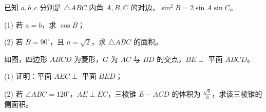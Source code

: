 \begin{question}
已知 $a,b,c$ 分别是 $\triangle ABC$ 内角 $A,B,C$ 的对边，$\sin^2B=2\sin A\sin C$。

(1) 若 $a=b$，求 $\cos B$；

(2) 若 $B=90^\circ$，且 $a=\sqrt2$，求 $\triangle ABC$ 的面积。

\Needspace{0.4\textheight}
\end{question}
\begin{question}
如图，四边形 $ABCD$ 为菱形，$G$ 为 $AC$ 与 $BD$ 的交点，$BE\perp$ 平面 $ABCD$。

(1) 证明：平面 $AEC\perp$ 平面 $BED$；

(2) 若 $\angle ABC=120^\circ$，$AE\perp EC$，三棱锥 $E-ACD$ 的体积为 $\frac{\sqrt6}{3}$，求该三棱锥的侧面积。
\nopagebreak[4]
\begin{center}\end{center}
\nopagebreak[4]
\Needspace{0.4\textheight}
\end{question}
